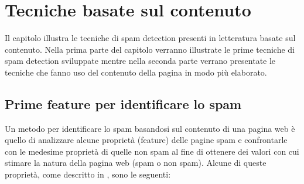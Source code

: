 \chapter{Tecniche basate sul contenuto}
Il capitolo illustra le tecniche di spam detection presenti in letteratura basate sul contenuto. Nella prima parte del capitolo verranno illustrate le prime tecniche di spam detection sviluppate mentre nella seconda parte verrano presentate le tecniche che fanno uso del contenuto della pagina in modo più elaborato.


\section{Prime feature per identificare lo spam}
\label{subsec:Feature}
Un metodo per identificare lo spam basandosi sul contenuto di una pagina web è quello di analizzare alcune proprietà (feature) delle pagine spam e confrontarle  con le medesime proprietà di quelle non spam al fine di ottenere dei valori con cui stimare la natura della pagina web (spam o non spam). Alcune di queste proprietà, come descritto in \cite{Fetterly:2004:SDS:1017074.1017077}, sono le seguenti:
